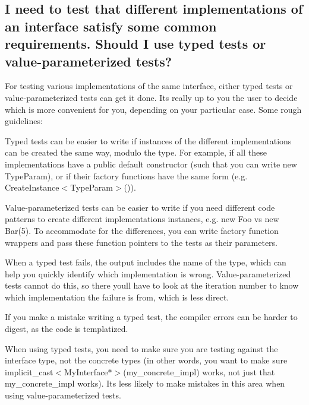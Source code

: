 \subsection*{I need to test that different implementations of an interface satisfy some common requirements. Should I use typed tests or value-\/parameterized tests?}

For testing various implementations of the same interface, either typed tests or value-\/parameterized tests can get it done. It\textquotesingle{}s really up to you the user to decide which is more convenient for you, depending on your particular case. Some rough guidelines\+:


\begin{DoxyItemize}
\item Typed tests can be easier to write if instances of the different implementations can be created the same way, modulo the type. For example, if all these implementations have a public default constructor (such that you can write {\ttfamily new Type\+Param}), or if their factory functions have the same form (e.\+g. {\ttfamily Create\+Instance$<$Type\+Param$>$()}).
\item Value-\/parameterized tests can be easier to write if you need different code patterns to create different implementations\textquotesingle{} instances, e.\+g. {\ttfamily new Foo} vs {\ttfamily new Bar(5)}. To accommodate for the differences, you can write factory function wrappers and pass these function pointers to the tests as their parameters.
\item When a typed test fails, the output includes the name of the type, which can help you quickly identify which implementation is wrong. Value-\/parameterized tests cannot do this, so there you\textquotesingle{}ll have to look at the iteration number to know which implementation the failure is from, which is less direct.
\item If you make a mistake writing a typed test, the compiler errors can be harder to digest, as the code is templatized.
\item When using typed tests, you need to make sure you are testing against the interface type, not the concrete types (in other words, you want to make sure {\ttfamily implicit\+\_\+cast$<$My\+Interface$\ast$$>$(my\+\_\+concrete\+\_\+impl)} works, not just that {\ttfamily my\+\_\+concrete\+\_\+impl} works). It\textquotesingle{}s less likely to make mistakes in this area when using value-\/parameterized tests.
\end{DoxyItemize}

